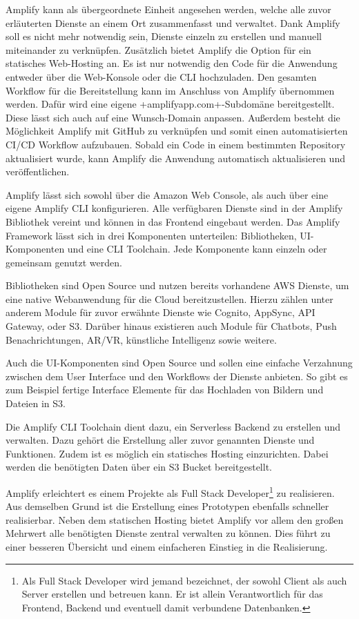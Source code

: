{Amplify kann als übergeordnete Einheit angesehen werden, welche alle zuvor erläuterten Dienste an einem Ort zusammenfasst und verwaltet.
Dank Amplify soll es nicht mehr notwendig sein, Dienste einzeln zu erstellen und manuell miteinander zu verknüpfen.
Zusätzlich bietet Amplify die Option für ein statisches Web-Hosting an.
Es ist nur notwendig den Code für die Anwendung entweder über die Web-Konsole oder die CLI hochzuladen.
Den gesamten Workflow für die Bereitstellung kann im Anschluss von Amplify übernommen werden.
Dafür wird eine eigene \spverb+amplifyapp.com+-Subdomäne bereitgestellt.
Diese lässt sich auch auf eine Wunsch-Domain anpassen.
Außerdem besteht die Möglichkeit Amplify mit GitHub zu verknüpfen und somit einen automatisierten CI/CD Workflow aufzubauen.
Sobald ein Code in einem bestimmten Repository aktualisiert wurde, kann Amplify die Anwendung automatisch aktualisieren und veröffentlichen.
 \cite[]{AmplifyHosting}

Amplify lässt sich sowohl über die Amazon Web Console, als auch über eine eigene Amplify CLI konfigurieren.
Alle verfügbaren Dienste sind in der Amplify Bibliothek vereint und können in das Frontend eingebaut werden.
Das Amplify Framework lässt sich in drei Komponenten unterteilen: Bibliotheken, UI-Komponenten und eine CLI Toolchain.
Jede Komponente kann einzeln oder gemeinsam genutzt werden.

Bibliotheken sind Open Source und nutzen bereits vorhandene AWS Dienste, um eine native Webanwendung für die Cloud bereitzustellen.
Hierzu zählen unter anderem Module für zuvor erwähnte Dienste wie Cognito, AppSync, API Gateway, oder S3.
Darüber hinaus existieren auch Module für Chatbots, Push Benachrichtungen, AR/VR, künstliche Intelligenz sowie weitere.

Auch die UI-Komponenten sind Open Source und sollen eine einfache Verzahnung zwischen dem User Interface und den Workflows der Dienste anbieten.
So gibt es zum Beispiel fertige Interface Elemente für das Hochladen von Bildern und Dateien in S3.

Die Amplify CLI Toolchain dient dazu, ein Serverless Backend zu erstellen und verwalten.
Dazu gehört die Erstellung aller zuvor genannten Dienste und Funktionen.
Zudem ist es möglich ein statisches Hosting einzurichten.
Dabei werden die benötigten Daten über ein S3 Bucket bereitgestellt.

Amplify erleichtert es einem Projekte als Full Stack Developer\footnote{Als Full Stack Developer wird jemand bezeichnet, der sowohl Client als auch Server
erstellen und betreuen kann. Er ist allein Verantwortlich für das Frontend, Backend und eventuell damit verbundene Datenbanken.} zu realisieren.
Aus demselben Grund ist die Erstellung eines Prototypen ebenfalls schneller realisierbar.
Neben dem statischen Hosting bietet Amplify vor allem den großen Mehrwert alle benötigten Dienste zentral verwalten zu können.
Dies führt zu einer besseren Übersicht und einem einfacheren Einstieg in die Realisierung.
 \cite[]{AWSAmplifyKomponenten}


}
